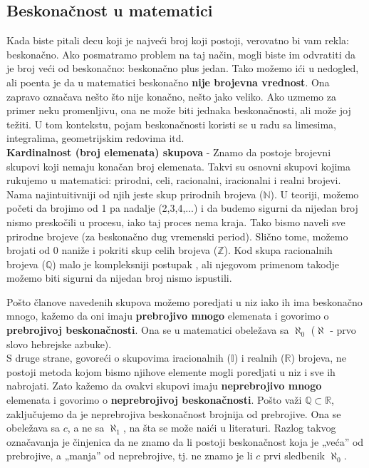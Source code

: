 \documentclass[a4paper]{article}
\begin{document}
\subsection{Beskonačnost u matematici}

Kada biste pitali decu koji je najveći broj koji postoji, verovatno bi vam rekla: beskonačno. Ako posmatramo problem na taj način, mogli biste im odvratiti da je broj veći od beskonačno: beskonačno plus jedan. Tako možemo ići u nedogled, ali poenta je da u matematici beskonačno \textbf{nije brojevna vrednost}. Ona zapravo označava nešto što nije konačno, nešto jako veliko. Ako uzmemo za primer neku promenljivu, ona ne može biti jednaka beskonačnosti, ali može joj težiti. U tom kontekstu, pojam beskonačnosti koristi se u radu sa limesima, integralima, geometrijskim redovima itd.\\

\textbf{Kardinalnost (broj elemenata) skupova} - Znamo da postoje brojevni skupovi koji nemaju konačan broj elemenata. Takvi su osnovni skupovi kojima rukujemo u matematici: prirodni, celi, racionalni, iracionalni i realni brojevi.\\

Nama najintuitivniji od njih jeste skup prirodnih brojeva ($\mathbb{N}$). U teoriji, možemo početi da brojimo od 1 pa nadalje (2,3,4,...) i da budemo sigurni da nijedan broj nismo preskočili u procesu, iako taj proces nema kraja. Tako bismo naveli sve prirodne brojeve (za beskonačno dug vremenski period). Slično tome, možemo brojati od 0 naniže i pokriti skup celih brojeva ($\mathbb{Z}$). Kod skupa racionalnih brojeva ($\mathbb{Q}$) malo je kompleksniji postupak \cite{Kantorov dijagonalni postupak}, ali njegovom primenom takodje možemo biti sigurni da nijedan broj nismo ispustili.

Pošto članove navedenih skupova možemo poredjati u niz iako ih ima beskonačno mnogo, kažemo da oni imaju \textbf{prebrojivo mnogo} elemenata i govorimo o \textbf{prebrojivoj beskonačnosti}. Ona se u matematici obeležava sa $\aleph_{0}$ ($\aleph$ - prvo slovo hebrejske azbuke).\\

S druge strane, govoreći o skupovima iracionalnih ($\mathbb{I}$) i realnih ($\mathbb{R}$) brojeva, ne postoji metoda kojom bismo njihove elemente mogli poredjati u niz i sve ih nabrojati. Zato kažemo da ovakvi skupovi imaju \textbf{neprebrojivo mnogo} elemenata i govorimo o \textbf{neprebrojivoj beskonačnosti}. Pošto važi $\mathbb{Q}\subset \mathbb{R}$, zaključujemo da je neprebrojiva beskonačnost brojnija od prebrojive. Ona se obeležava sa $c$, a ne sa $\aleph_{1}$, na šta se može naići u literaturi. Razlog takvog označavanja je činjenica da ne znamo da li postoji beskonačnost koja je „veća” od prebrojive, a „manja” od neprebrojive, tj. ne znamo je li $c$ prvi sledbenik $\aleph_{0}$.\\
\end{document}
